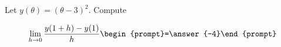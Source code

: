 \documentclass{ximera}
\author{Bart Snapp}
\begin{document}
\begin{exercise}
Let $y(\theta) = (\theta -3)^2$. Compute

\[
\lim_{ h\to 0 } \frac{y(1+h)-y(1)}{h} \begin{prompt}=\answer{-4}\end{prompt}
\]
\end{exercise}
\end{document}
